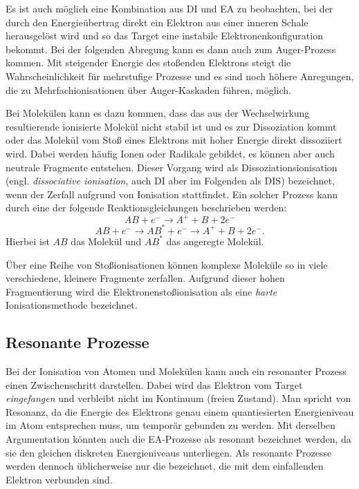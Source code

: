 Es ist auch möglich eine Kombination aus DI und EA zu beobachten, bei der durch den Energieübertrag direkt ein Elektron aus einer inneren Schale herausgelöst wird und so das Target eine instabile Elektronenkonfiguration bekommt. Bei der folgenden Abregung kann es dann auch zum Auger-Prozess kommen. Mit steigender Energie des stoßenden Elektrons steigt die Wahrscheinlichkeit für mehrstufige Prozesse und es sind noch höhere Anregungen, die zu Mehrfachionisationen über Auger-Kaskaden führen, möglich.

Bei Molekülen kann es dazu kommen, dass das aus der Wechselwirkung resultierende ionisierte Molekül nicht stabil ist und es zur Dissoziation kommt oder das Molekül vom Stoß eines Elektrons mit hoher Energie direkt dissoziiert wird. Dabei werden häufig Ionen oder Radikale gebildet, es können aber auch neutrale Fragmente entstehen. Dieser Vorgang wird als Dissoziationsionisation (engl. \textit{dissociative ionisation}, auch DI aber im Folgenden als DIS) bezeichnet, wenn der Zerfall aufgrund von Ionisation stattfindet. Ein solcher Prozess kann durch eine der folgende Reaktionsgleichungen beschrieben werden:
\begin{equation}
    AB + e^- \rightarrow A^{+} + B + 2e^-
\end{equation}
\begin{equation}
    AB + e^- \rightarrow AB^* + e^- \rightarrow A^{+} + B + 2e^-.
\end{equation} 
Hierbei ist $AB$ das Molekül und $AB^*$ das angeregte Molekül.

Über eine Reihe von Stoßionisationen können komplexe Moleküle so in viele verschiedene, kleinere Fragmente zerfallen. Aufgrund dieser hohen Fragmentierung wird die Elektronenstoßionisation als eine \textit{harte} Ionisationsmethode bezeichnet.

\subsection{Resonante Prozesse}
Bei der Ionisation von Atomen und Molekülen kann auch ein resonanter Prozess einen Zwischenschritt darstellen. Dabei wird das Elektron vom Target \textit{eingefangen} und verbleibt nicht im Kontinuum (freien Zustand). Man spricht von Resonanz, da die Energie des Elektrons genau einem quantiesierten Energieniveau im Atom entsprechen muss, um temporär gebunden zu werden. Mit derselben Argumentation könnten auch die EA-Prozesse als resonant bezeichnet werden, da sie den gleichen diskreten Energieniveaus unterliegen. Als resonante Prozesse werden dennoch üblicherweise nur die bezeichnet, die mit dem einfallenden Elektron verbunden sind.

